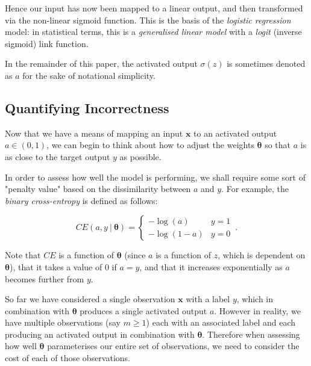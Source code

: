 \documentclass{article}[11pt]
\begin{document}
        Hence our input has now been mapped to a linear output, and then transformed via the non-linear sigmoid function. This is the basis of the \textit{logistic regression} model: in statistical terms, this is a \textit{generalised linear model} with a \textit{logit} (inverse sigmoid) link function.
        
        In the remainder of this paper, the activated output $\sigma(z)$ is sometimes denoted as $a$ for the sake of notational simplicity.
        
        
        
    \subsection{Quantifying Incorrectness} \label{sec:costfun}
        
        Now that we have a means of mapping an input $\mathbf{x}$ to an activated output $a \in (0, 1)$, we can begin to think about how to adjust the weights $\boldsymbol{\theta}$ so that $a$ is as close to the target output $y$ as possible.
        
        In order to assess how well the model is performing, we shall require some sort of "penalty value" based on the dissimilarity between $a$ and $y$. For example, the \textit{binary cross-entropy} is defined as follows:
        
        $$
        CE(a, y \ \vert \ \boldsymbol{\theta}) = \begin{cases}
            -\log(a) & y = 1 \\
            -\log(1-a) & y = 0
        \end{cases} \,.
        $$        
        
        Note that $CE$ is a function of $\boldsymbol{\theta}$ (since $a$ is a function of $z$, which is dependent on $\boldsymbol{\theta}$), that it takes a value of 0 if $a = y$, and that it increases exponentially as $a$ becomes further from $y$.
        
        So far we have considered a single observation $\mathbf{x}$ with a label $y$, which in combination with $\boldsymbol{\theta}$ produces a single activated output $a$. However in reality, we have multiple observations (say $m \geq 1$) each with an associated label and each producing an activated output in combination with $\boldsymbol{\theta}$. Therefore when assessing how well $\boldsymbol{\theta}$ parameterises our entire set of observations, we need to consider the cost of each of those observations.
        
\end{document}
